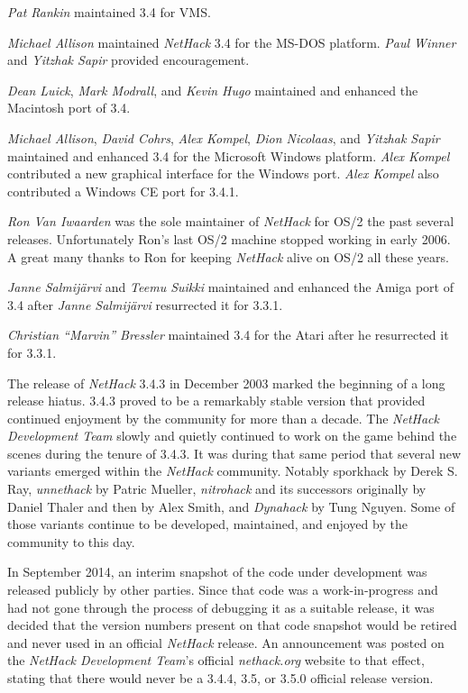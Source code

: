 \documentclass[titlepage]{article}
\begin{document}
\medskip
\noindent\textit{Pat Rankin} maintained 3.4 for VMS.

\medskip
\noindent \textit{Michael Allison} maintained \textit{NetHack} 3.4 for the MS-DOS
platform.
\textit{Paul Winner} and \textit{Yitzhak Sapir} provided encouragement.

\medskip
\noindent \textit{Dean Luick}, \textit{Mark Modrall}, and \textit{Kevin Hugo} maintained and
enhanced the Macintosh port of 3.4.

\medskip
\noindent \textit{Michael Allison}, \textit{David Cohrs}, \textit{Alex Kompel},
\textit{Dion Nicolaas}, and
\textit{Yitzhak Sapir} maintained and enhanced 3.4 for the Microsoft Windows
platform.
\textit{Alex Kompel} contributed a new graphical interface for the Windows port.
\textit{Alex Kompel} also contributed a Windows CE port for 3.4.1.

\medskip
\noindent \textit{Ron Van Iwaarden} was the sole maintainer of \textit{NetHack} for
OS/2 the past
several releases. Unfortunately Ron's last OS/2 machine stopped working in
early 2006. A great many thanks to Ron for keeping \textit{NetHack} alive on
OS/2 all these years.

\medskip
\noindent \textit{Janne Salmij\"{a}rvi} and \textit{Teemu Suikki} maintained
and enhanced the Amiga port of 3.4 after \textit{Janne Salmij\"{a}rvi} resurrected
it for 3.3.1.

\medskip
\noindent \textit{Christian ``Marvin'' Bressler} maintained 3.4 for the Atari after he
resurrected it for 3.3.1.

\medskip
The release of \textit{NetHack} 3.4.3 in December 2003 marked the beginning of
a long release hiatus. 3.4.3 proved to be a remarkably stable version that
provided continued enjoyment by the community for more than a decade. The
\textit{NetHack Development Team} slowly and quietly continued to work on the game behind the scenes
during the tenure of 3.4.3. It was during that same period that several new
variants emerged within the \textit{NetHack} community. Notably sporkhack by
Derek S. Ray, \textit{unnethack} by Patric Mueller, \textit{nitrohack} and its
successors originally by Daniel Thaler and then by Alex Smith, and
\textit{Dynahack} by Tung Nguyen.
Some of those variants continue to be
developed, maintained, and enjoyed by the community to this day.

\medskip
In September 2014, an interim snapshot of the code under development was
released publicly by other parties.
Since that code was a work-in-progress
and had not gone through the process of debugging it as a suitable release,
it was decided that the version numbers present on that code snapshot would
be retired and never used in an official \textit{NetHack} release.
An announcement was posted on the \textit{NetHack Development Team}'s official
\textit{nethack.org} website
to that effect, stating that there would never be a 3.4.4, 3.5, or 3.5.0
official release version.
\end{document}
